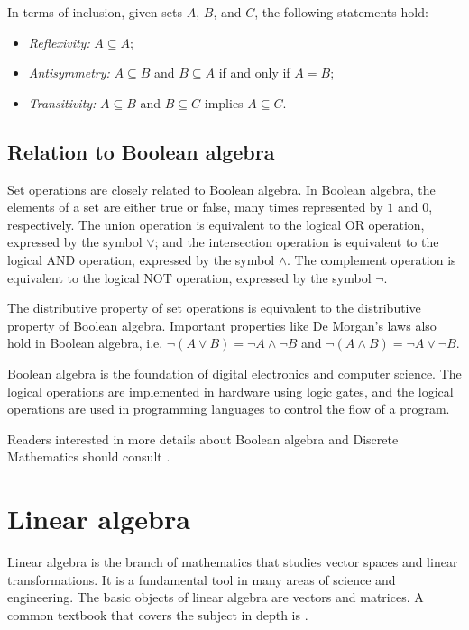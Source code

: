 In terms of inclusion, given sets $A$, $B$, and $C$, the following statements hold:
\begin{itemize}
  \item \emph{Reflexivity:} $A \subseteq A$;
  \item \emph{Antisymmetry:} $A \subseteq B$ and $B \subseteq A$ if and only if $A = B$;
  \item \emph{Transitivity:} $A \subseteq B$ and $B \subseteq C$ implies $A \subseteq C$.
\end{itemize}

\subsection{Relation to Boolean algebra}

Set operations are closely related to Boolean algebra.  In Boolean algebra, the elements
of a set are either true or false, many times represented by $1$ and $0$, respectively.
The union operation is equivalent to the logical OR operation, expressed by the symbol
$\lor$; and the intersection operation is equivalent to the logical AND operation,
expressed by the symbol $\land$.  The complement operation is equivalent to the logical
NOT operation, expressed by the symbol $\lnot$.

The distributive property of set operations is equivalent to the distributive property of
Boolean algebra.  Important properties like De Morgan's laws also hold in Boolean algebra,
i.e. $\lnot (A \lor B) = \lnot A \land \lnot B$ and $\lnot (A \land B) = \lnot A \lor
\lnot B$.

Boolean algebra is the foundation of digital electronics and computer science.  The
logical operations are implemented in hardware using logic gates, and the logical
operations are used in programming languages to control the flow of a program.

Readers interested in more details about Boolean algebra and Discrete Mathematics
should consult \textcite{Rosen2018}.

\section{Linear algebra}

Linear algebra is the branch of mathematics that studies vector spaces and linear
transformations.  It is a fundamental tool in many areas of science and engineering.
The basic objects of linear algebra are vectors and matrices.  A common textbook that
covers the subject in depth is \textcite{Strang2023}.

